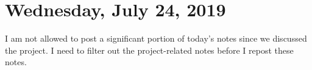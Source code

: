 \section{Wednesday, July 24, 2019}
I am not allowed to post a significant portion of today's notes since we discussed the project. I need to filter out the project-related notes before I repost these notes. 